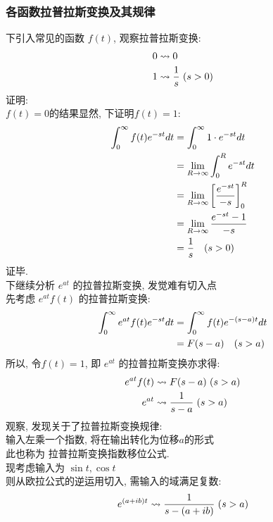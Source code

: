 \subsubsection{\large \hspace*{0.1em}各函数拉普拉斯变换及其规律}
下引入常见的函数 $f(t)$, 观察拉普拉斯变换:
\begin{align*}
 0 &\rightsquigarrow  0 \\
 1 &\rightsquigarrow  \frac{1}{s} \hspace*{0.3em} (s > 0) 
\end{align*}
证明:\\
$f(t) = 0 $的结果显然, 下证明$f(t) = 1$:
\begin{align*}
   \int_{0}^{\infty} f(t) e^{-st} dt &= \int_{0}^{\infty} 1\cdot e^{-st} dt  \\
   &=  \lim_{R \to \infty}  \int_{0}^{R} e^{-s t} dt \\
   &=  \lim_{R \to \infty}  \left[ \frac{e^{-st}}{-s} \right]_0^R \\
   &=  \lim_{R \to \infty}  \frac{e^{-st} - 1}{-s} \\
   &= \frac{1}{s} \hspace*{1em} (s > 0)
\end{align*}
\hfill 证毕.\\
下继续分析 $e^{at}$ 的拉普拉斯变换, 发觉难有切入点\\
先考虑 $e^{at} f(t)$ 的拉普拉斯变换:
\begin{align*}
   \int_{0}^{\infty} e^{at} f(t) e^{-st} dt &= \int_{0}^{\infty} f(t) e^{-(s-a)t} dt \\
   &= F(s-a)  \hspace*{1em} (s > a)
\end{align*}
所以, 令$f(t) = 1$, 即 $e^{at}$ 的拉普拉斯变换亦求得:
\begin{align*}
   e^{at} f(t) &\rightsquigarrow  F(s-a) \hspace*{0.3em} (s > a) \\
   e^{at} &\rightsquigarrow  \frac{1}{s-a} \hspace*{0.3em} (s > a)
\end{align*}
观察, 发现关于了拉普拉斯变换规律:\\
输入左乘一个指数, 将在输出转化为位移$a$的形式\\
此也称为 拉普拉斯变换指数移位公式.\\[1em]
现考虑输入为 $\sin t , \cos t $\\
则从欧拉公式的逆运用切入, 需输入的域满足复数:
\[ e^{(a+ib)t} \rightsquigarrow \frac{1}{s-(a+ib)}  \hspace*{0.3em} (s > a) \]
